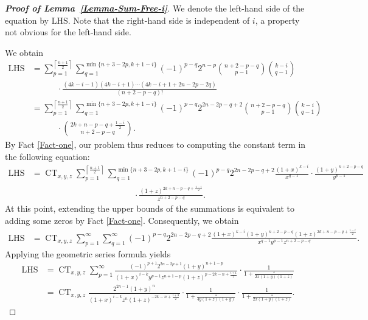 \documentclass[reqno, 12pt]{article}
\theoremstyle{mydefinition}
\theoremstyle{myremark}
\numberwithin{algorithm}{section}
\begin{document}
\begin{proof}[{\bf Proof of Lemma~\ref{Lemma-Sum-Free-i}}]
We denote the left-hand side of the equation by $\mathrm{LHS}$.
Note that the right-hand side is independent of $i$, a property not obvious for the left-hand side.

We obtain
\begin{align*}
\mathrm{LHS}&=\sum_{p=1}^{\left\lceil \frac{n+1}{2}\right\rceil} \sum_{q=1}^{\min\{n+3-2p,k+1-i\}}
(-1)^{p-q}2^{n-p}\binom{n+2-p-q}{p-1}\binom{k-i}{q-1}
\\ &\quad\quad\quad \cdot\frac{(4k-i-1)(4k-i+1)\cdots (4k-i+1+2n-2p-2q)}{(n+2-p-q)!}
\\ & =\sum_{p=1}^{\left\lceil \frac{n+1}{2}\right\rceil} \sum_{q=1}^{\min\{n+3-2p,k+1-i\}}(-1)^{p-q}2^{2n-2p-q+2}\binom{n+2-p-q}{p-1}\binom{k-i}{q-1}
\\ &\quad\quad\quad \cdot \binom{2k+n-p-q+\frac{1-i}{2}}{n+2-p-q}.
\end{align*}
By Fact \ref{Fact-one}, our problem thus reduces to computing the constant term in the following equation:
\begin{align*}
\mathrm{LHS}&=\mathop{\mathrm{CT}}_{x,y,z}\sum_{p=1}^{\left\lceil \frac{n+1}{2}\right\rceil} \sum_{q=1}^{\min\{n+3-2p,k+1-i\}}
(-1)^{p-q}2^{2n-2p-q+2} \frac{(1+x)^{k-i}}{x^{q-1}}\cdot \frac{(1+y)^{n+2-p-q}}{y^{p-1}}
\\ &\quad\quad\quad\quad\quad\quad\quad\quad\quad\quad\quad\quad  \cdot\frac{(1+z)^{2k+n-p-q+\frac{1-i}{2}}}{z^{n+2-p-q}}.
\end{align*}
At this point, extending the upper bounds of the summations is equivalent to adding some zeros by Fact \ref{Fact-one}.
Consequently, we obtain
\begin{align*}
\mathrm{LHS}&=\mathop{\mathrm{CT}}_{x,y,z}\sum_{p=1}^{\infty} \sum_{q=1}^{\infty}
(-1)^{p-q}2^{2n-2p-q+2} \frac{(1+x)^{k-i}(1+y)^{n+2-p-q}(1+z)^{2k+n-p-q+\frac{1-i}{2}}}{x^{q-1}y^{p-1}z^{n+2-p-q}}.
\end{align*}
Applying the geometric series formula yields
\begin{align*}
\mathrm{LHS}&=\mathop{\mathrm{CT}}_{x,y,z}\sum_{p=1}^{\infty} \frac{(-1)^{p+1}2^{2n-2p+1}(1+y)^{n+1-p}}{(1+x)^{i-k}y^{p-1}z^{n+1-p}(1+z)^{p-2k-n+\frac{i+1}{2}}}\cdot \frac{1}{1+\frac{z}{2x(1+y)(1+z)}}
\\ &=\mathop{\mathrm{CT}}_{x,y,z}\frac{2^{2n-1}(1+y)^n}{(1+x)^{i-k}z^n(1+z)^{-2k-n+\frac{i+3}{2}}}
\cdot\frac{1}{1+\frac{z}{4y(1+z)(1+y)}}\cdot \frac{1}{1+\frac{z}{2x(1+y)(1+z)}}.
\end{align*}

\end{proof}
\end{document}

